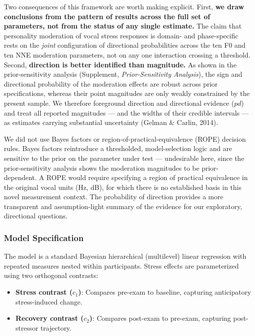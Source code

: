 \documentclass[
  english,
  man,floatsintext]{apa6}
\providecommand{\tightlist}{%
  \setlength{\itemsep}{0pt}\setlength{\parskip}{0pt}}
\begin{document}
Two consequences of this framework are worth making explicit. First, \textbf{we draw conclusions
from the pattern of results across the full set of parameters, not from the status of any
single estimate.} The claim that personality moderation of vocal stress responses is
domain- and phase-specific rests on the \emph{joint} configuration of directional probabilities
across the ten F0 and ten NNE moderation parameters, not on any one interaction crossing a
threshold. Second, \textbf{direction is better identified than magnitude.} As shown in the
prior-sensitivity analysis (Supplement, \emph{Prior-Sensitivity Analysis}), the sign and
directional probability of the moderation effects are robust across prior specifications,
whereas their point magnitudes are only weakly constrained by the present sample. We
therefore foreground direction and directional evidence (\(pd\)) and treat all reported
magnitudes --- and the widths of their credible intervals --- as estimates carrying
substantial uncertainty (Gelman \& Carlin, 2014).

We did not use Bayes factors or region-of-practical-equivalence (ROPE) decision rules.
Bayes factors reintroduce a thresholded, model-selection logic and are sensitive to the
prior on the parameter under test --- undesirable here, since the prior-sensitivity analysis
shows the moderation magnitudes to be prior-dependent. A ROPE would require specifying a
region of practical equivalence in the original vocal units (Hz, dB), for which there is no
established basis in this novel measurement context. The probability of direction provides
a more transparent and assumption-light summary of the evidence for our exploratory,
directional questions.

\subsubsection{Model Specification}\label{model-specification}

The model is a standard Bayesian hierarchical (multilevel) linear regression with repeated measures nested within participants. Stress effects are parameterized using two orthogonal contrasts:

\begin{itemize}
\tightlist
\item
  \textbf{Stress contrast (\(c_1\))}: Compares pre-exam to baseline, capturing anticipatory stress-induced change.
\item
  \textbf{Recovery contrast (\(c_2\))}: Compares post-exam to pre-exam, capturing post-stressor trajectory.
\end{itemize}
\end{document}
